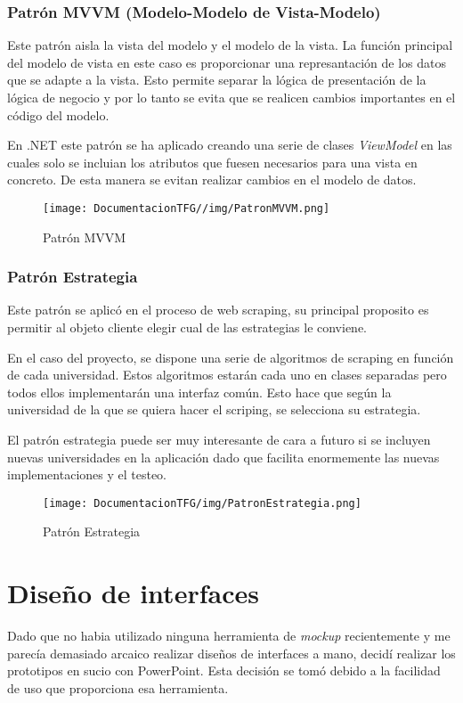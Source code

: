 \subsubsection{Patrón MVVM (Modelo-Modelo de Vista-Modelo)}

Este patrón aisla la vista del modelo y el modelo de la vista. La función principal del modelo de vista en este caso es proporcionar una represantación de los datos que se adapte a la vista. Esto permite separar la lógica de presentación de la lógica de negocio y por lo tanto se evita que se realicen cambios importantes en el código del modelo.

En .NET este patrón se ha aplicado creando una serie de clases \textit{ViewModel} en las cuales solo se incluian los atributos que fuesen necesarios para una vista en concreto. De esta manera se evitan realizar cambios en el modelo de datos.

\begin{figure}[H]
    \centering
    \texttt{[image: DocumentacionTFG//img/PatronMVVM.png]}
    \caption{Patrón MVVM}
\end{figure}

\subsubsection{Patrón Estrategia}
Este patrón se aplicó en el proceso de web scraping, su principal proposito es permitir al objeto cliente elegir cual de las estrategias le conviene.

En el caso del proyecto, se dispone una serie de algoritmos de scraping en función de cada universidad. Estos algoritmos estarán cada uno en clases separadas pero todos ellos implementarán una interfaz común. Esto hace que según la universidad de la que se quiera hacer el scriping, se selecciona su estrategia.

El patrón estrategia puede ser muy interesante de cara a futuro si se incluyen nuevas universidades en la aplicación dado que facilita enormemente las nuevas implementaciones y el testeo.
\begin{figure}[H]
    \centering
    \texttt{[image: DocumentacionTFG/img/PatronEstrategia.png]}
    \caption{Patrón Estrategia}
\end{figure}

\section{Diseño de interfaces}
Dado que no habia utilizado ninguna herramienta de \textit{mockup} recientemente y me parecía demasiado arcaico realizar diseños de interfaces a mano, decidí realizar los prototipos en sucio con PowerPoint. Esta decisión se tomó debido a la facilidad de uso que proporciona esa herramienta. 

